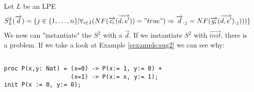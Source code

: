\index{}\documentclass[a4paper,10pt]{article}
\theoremstyle{plain}
\theoremstyle{definition}
\newcommand{\ovr}{\overrightarrow}
\begin{document}
\begin{defn} Let $L$ be an LPE\label{def:sug2} 
\begin{displaymath}
S_L^2(\ovr{d})=
\lbrace   
j \in \lbrace 1, \ldots , n \rbrace \vert \forall_{i\in I} (NF(\ovr{c_i}(\ovr{d,e'})) = "true") \Rightarrow \ovr{d}._j = NF(\ovr{g_i}(\ovr{d,e'})._j)))\rbrace
\end{displaymath}
We now can "instantiate" the $S^2$ with a $\ovr{d}$. If we instantiate $S^2$ with $\ovr{init}$, there is a problem. If we take a look at Example \ref{cexample:sug2} we can see why:
\begin{example} [Let $E2$ be]\label{cexample:sug2}\begin{verbatim} 
 
proc P(x,y: Nat) = (x=0) -> P(x:= 1, y:= 0) +
                   (x=1) -> P(x:= x, y:= 1);
init P(x := 0, y:= 0);


\end{verbatim}
\end{example}
\end{defn}
\end{document}
